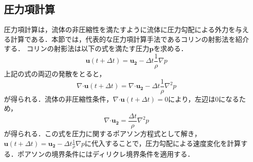 \documentclass[a4j,12pt]{jreport}
\begin{document}
\subsection{圧力項計算}
圧力項計算は，流体の非圧縮性を満たすように流体に圧力勾配による外力を与える計算である．本節では，代表的な圧力項計算手法であるコリンの射影法\cite{Chorin}を紹介する．
コリンの射影法は以下の式を満たす圧力$\bm{p}$を求める．
\[
	\bm{u} (t + \varDelta t)=  \bm{u_2} - \varDelta t \frac{1}{\rho}\nabla p
\]
上記の式の両辺の発散をとると，
\[
	\nabla\boldsymbol{\cdot}\bm{u} (t + \varDelta t)=  \nabla\boldsymbol{\cdot}\bm{u_2} - \varDelta t \frac{1}{\rho}\nabla^2 p
\]
が得られる．流体の非圧縮性条件，$\nabla\boldsymbol{\cdot}\bm{u} (t + \varDelta t)= 0$により，左辺は0になるため，
\begin{equation}
\nabla\boldsymbol{\cdot}\bm{u_2} = \frac{\varDelta t}{\rho}\nabla^2 p
\end{equation} 
が得られる．この式を圧力に関するポアソン方程式として解き，$\bm{u} (t + \varDelta t)=  \bm{u_2} - \varDelta t \frac{1}{\rho}\nabla p$に代入することで，圧力勾配による速度変化を計算する．ポアソンの境界条件にはディリクレ境界条件を適用する．


		
		
\end{document}
